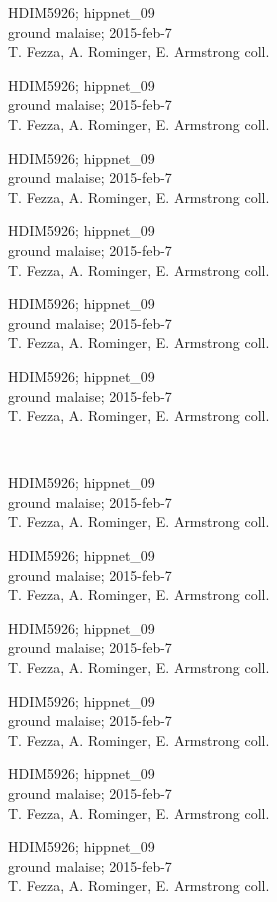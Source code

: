 \documentclass[2pt]{extarticle}
\begin{document}
\noindent
\parbox{0.16\textwidth}{\tiny \raggedright \rule[-0.3\baselineskip]{0pt}{10pt}HDIM5926; hippnet\_09\\ ground malaise; 2015-feb-7\\ T. Fezza, A. Rominger, E. Armstrong coll.}
\parbox{0.16\textwidth}{\tiny \raggedright \rule[-0.3\baselineskip]{0pt}{10pt}HDIM5926; hippnet\_09\\ ground malaise; 2015-feb-7\\ T. Fezza, A. Rominger, E. Armstrong coll.}
\parbox{0.16\textwidth}{\tiny \raggedright \rule[-0.3\baselineskip]{0pt}{10pt}HDIM5926; hippnet\_09\\ ground malaise; 2015-feb-7\\ T. Fezza, A. Rominger, E. Armstrong coll.}
\parbox{0.16\textwidth}{\tiny \raggedright \rule[-0.3\baselineskip]{0pt}{10pt}HDIM5926; hippnet\_09\\ ground malaise; 2015-feb-7\\ T. Fezza, A. Rominger, E. Armstrong coll.}
\parbox{0.16\textwidth}{\tiny \raggedright \rule[-0.3\baselineskip]{0pt}{10pt}HDIM5926; hippnet\_09\\ ground malaise; 2015-feb-7\\ T. Fezza, A. Rominger, E. Armstrong coll.}
\parbox{0.16\textwidth}{\tiny \raggedright \rule[-0.3\baselineskip]{0pt}{10pt}HDIM5926; hippnet\_09\\ ground malaise; 2015-feb-7\\ T. Fezza, A. Rominger, E. Armstrong coll.} \\ 
\vspace{0.001in} 

\noindent
\parbox{0.16\textwidth}{\tiny \raggedright \rule[-0.3\baselineskip]{0pt}{10pt}HDIM5926; hippnet\_09\\ ground malaise; 2015-feb-7\\ T. Fezza, A. Rominger, E. Armstrong coll.}
\parbox{0.16\textwidth}{\tiny \raggedright \rule[-0.3\baselineskip]{0pt}{10pt}HDIM5926; hippnet\_09\\ ground malaise; 2015-feb-7\\ T. Fezza, A. Rominger, E. Armstrong coll.}
\parbox{0.16\textwidth}{\tiny \raggedright \rule[-0.3\baselineskip]{0pt}{10pt}HDIM5926; hippnet\_09\\ ground malaise; 2015-feb-7\\ T. Fezza, A. Rominger, E. Armstrong coll.}
\parbox{0.16\textwidth}{\tiny \raggedright \rule[-0.3\baselineskip]{0pt}{10pt}HDIM5926; hippnet\_09\\ ground malaise; 2015-feb-7\\ T. Fezza, A. Rominger, E. Armstrong coll.}
\parbox{0.16\textwidth}{\tiny \raggedright \rule[-0.3\baselineskip]{0pt}{10pt}HDIM5926; hippnet\_09\\ ground malaise; 2015-feb-7\\ T. Fezza, A. Rominger, E. Armstrong coll.}
\parbox{0.16\textwidth}{\tiny \raggedright \rule[-0.3\baselineskip]{0pt}{10pt}HDIM5926; hippnet\_09\\ ground malaise; 2015-feb-7\\ T. Fezza, A. Rominger, E. Armstrong coll.} \\ 
\vspace{0.001in} 
\end{document}

